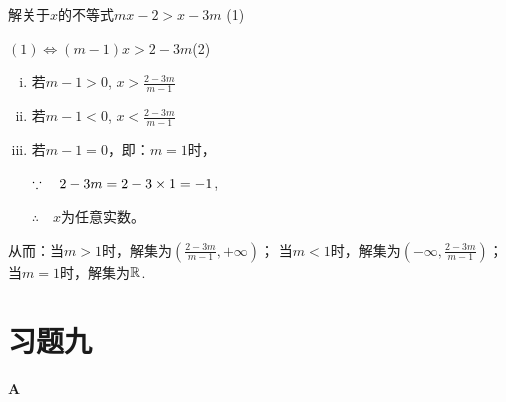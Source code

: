 \begin{example}
    解关于$x$的不等式$mx-2>x-3m$ \hfill(1)
\end{example}

\begin{solution}
    $(1)\Longleftrightarrow (m-1)x>2-3m$\hfill (2)
\begin{enumerate}[(i)]
    \item 若$m-1>0$, $x>\frac{2-3m}{m-1}$
    \item 若$m-1<0$, $x<\frac{2-3m}{m-1}$
    \item 若$m-1=0$，即：$m=1$时，

$\because\quad     2-3m=2-3\times1=-1$,

$\therefore\quad  x$为任意实数。   
\end{enumerate}

从而：当$m>1$时，解集为$\left(\frac{2-3m}{m-1},+\infty\right)$；
当$m<1$时，解集为$\left(-\infty, \frac{2-3m}{m-1}\right)$；
当$m=1$时，解集为$\mathbb{R}$.
\end{solution}

\section*{习题九}
\begin{center}
    \bfseries A
\end{center}


